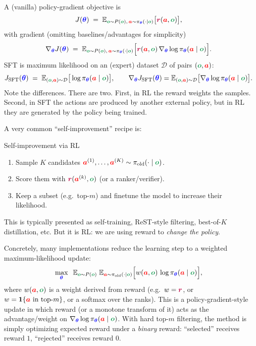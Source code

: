 \documentclass{article}
\newcommand{\colsym}[2]{\ensuremath{\textcolor{#1}{\boldsymbol{#2}}}}
\newcommand{\action}{\colsym{red}{a}}
\newcommand{\obs}{\colsym{ForestGreen}{o}}
\newcommand{\reward}{\colsym{purple}{r}}
\newcommand{\params}{\colsym{blue}{\theta}}
\begin{document}
A (vanilla) policy-gradient objective is
\[
J(\params) \;=\; \mathbb{E}_{\obs \sim P(\obs),\, \action \sim \pi_{\params}(\cdot\mid \obs)}\big[\reward(\action,\obs)\big],
\]
with gradient (omitting baselines/advantages for simplicity)
\[
\nabla_{\params} J(\params)
\;=\;
\mathbb{E}_{\obs \sim P(\obs),\, \action \sim \pi_{\params}(\cdot\mid \obs)}
\Big[\reward(\action,\obs)\,\nabla_{\params}\log \pi_{\params}(\action\mid \obs)\Big].
\]
SFT is maximum likelihood on an (expert) dataset $\mathcal{D}$ of pairs $(\obs,\action)$:
\[
J_{\mathrm{SFT}}(\params)
\;=\;
\mathbb{E}_{(\obs,\action)\sim\mathcal{D}}\big[\log \pi_{\params}(\action\mid \obs)\big],
\qquad
\nabla_{\params} J_{\mathrm{SFT}}(\params)
=
\mathbb{E}_{(\obs,\action)\sim\mathcal{D}}\big[\nabla_{\params}\log \pi_{\params}(\action\mid \obs)\big].
\]
Note the differences. There are two. First, in RL the reward weights the samples. Second, in SFT the actions are produced by another external policy, but in RL they are generated by the policy being trained.




A very common “self-improvement” recipe is:
\begin{examplebox}{Self-improvement via RL}
\begin{enumerate}
\item Sample $K$ candidates $\action^{(1)},\ldots,\action^{(K)} \sim \pi_{\text{old}}(\cdot \mid \obs)$.
\item Score them with $\reward(\action^{(k)},\obs)$ (or a ranker/verifier).
\item Keep a subset (e.g.\ top-$m$) and finetune the model to increase their likelihood.
\end{enumerate}
\end{examplebox}
This is typically presented as self-training, ReST-style filtering, best-of-$K$ distillation, etc. But it is RL: we are using reward to \emph{change the policy}.

Concretely, many implementations reduce the learning step to a weighted maximum-likelihood update:
\[
\max_{\params}\;\; \mathbb{E}_{\obs \sim P(\obs)}\;
\mathbb{E}_{\action \sim \pi_{\text{old}}(\cdot \mid \obs)}
\Big[w(\action,\obs)\,\log \pi_{\params}(\action \mid \obs)\Big],
\]
where $w(\action,\obs)$ is a weight derived from reward (e.g.\ $w=\reward$, or $w=\mathbf{1}\{\action \text{ in top-}m\}$, or a softmax over the ranks).
This is a policy-gradient-style update in which reward (or a monotone transform of it) acts as the advantage/weight on $\nabla_{\params}\log \pi_{\params}(\action\mid\obs)$.
With hard top-$m$ filtering, the method is simply optimizing expected reward under a \emph{binary} reward: “selected” receives reward $1$, “rejected” receives reward $0$.
\end{document}
